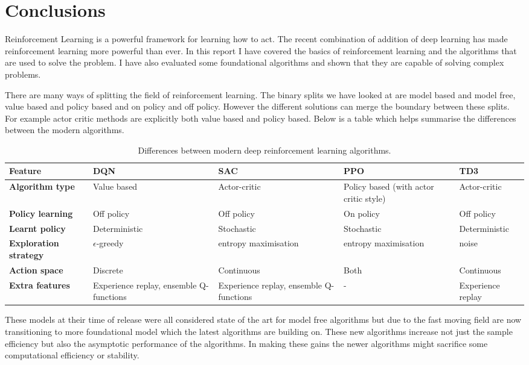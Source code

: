 \chapter{Conclusions}\label{C:con}

Reinforcement Learning is a powerful framework for learning how to act. The recent combination of addition of deep learning has made reinforcement learning more powerful than ever. In this report I have covered the basics of reinforcement learning and the algorithms that are used to solve the problem. I have also evaluated some foundational algorithms and shown that they are capable of solving complex problems. 

There are many ways of splitting the field of reinforcement learning. The binary splits we have looked at are model based and model free, value based and policy based and on policy and off policy. However the different solutions can merge the boundary between these splits. For example actor critic methods are explicitly both value based and policy based. Below is a table which helps summarise the differences between the modern algorithms.

\begin{table}[h]
    \footnotesize
    \centering
    \renewcommand{\arraystretch}{1.4} %
    \begin{tabularx}{\textwidth}{p{1.3cm} X X X X}
        \hline
        \textbf{Feature} & \textbf{DQN} & \textbf{SAC} & \textbf{PPO} & \textbf{TD3} \\
        \hline
        \textbf{Algorithm type}       & Value based      & Actor-critic         & Policy based (with actor critic style)              & Actor-critic  \\
        \textbf{Policy learning}      & Off policy        & Off policy           & On policy            & Off policy    \\
        \textbf{Learnt policy}        & Deterministic     & Stochastic           & Stochastic           & Deterministic \\
        \textbf{Exploration strategy} & $\epsilon$-greedy & entropy maximisation & entropy maximisation & noise         \\
        \textbf{Action space}         & Discrete          & Continuous           & Both                 & Continuous    \\
        \textbf{Extra features} & Experience replay, ensemble Q-functions & Experience replay, ensemble Q-functions & - & Experience replay \\
        \hline
    \end{tabularx}
    \caption{Differences between modern deep reinforcement learning algorithms.}
\end{table}
These models at their time of release were all considered state of the art for model free algorithms but due to the fast moving field are now transitioning to more foundational model which the latest algorithms are building on. These new algorithms increase not just the sample efficiency but also the asymptotic performance of the algorithms. In making these gains the newer algorithms might sacrifice some computational efficiency or stability.

